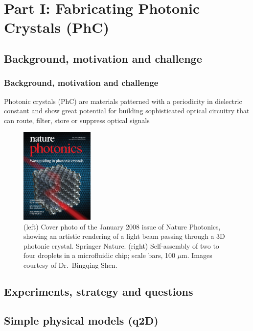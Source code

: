 \hypertarget{part1}{%
  \section{Part I: Fabricating Photonic Crystals (PhC)}}

\hypertarget{background1}{%
  \subsection{Background, motivation and challenge}}

\begin{frame}
  \frametitle{Background, motivation and challenge}

  Photonic crystals (PhC) are materials patterned with a periodicity in dielectric constant
  and show great potential for building sophisticated optical circuitry that can
  route, filter, store or suppress optical signals

  \begin{figure}
    \centering
    \includegraphics[height=4.73cm]{imgs/photonics_cover.jpg}
  \caption{(left) Cover photo of the January 2008 issue of Nature Photonics, showing an artistic rendering of a light beam passing through a 3D photonic crystal. \textcopyright \enspace Springer Nature. (right) Self-assembly of two to four droplets in a microfluidic chip; scale bars, 100 $\mu$m. Images courtesy of Dr.\ Bingqing Shen.}
  \label{fig:photonic-flow}
\end{figure}

\end{frame}

\hypertarget{experiment}{%
  \subsection{Experiments, strategy and questions}}

\hypertarget{dipolar}{%
  \subsection{Simple physical models (q2D)}}


